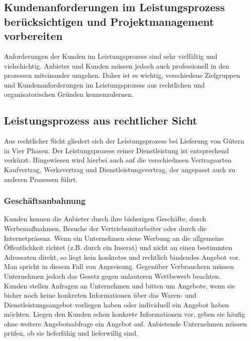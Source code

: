 \documentclass[a4paper, 12pt]{report}
\begin{document}
\begin{multicols}{2}
\section{Kundenanforderungen im Leistungsprozess berücksichtigen und
Projektmanagement vorbereiten}

Anforderungen der Kunden im Leistungsprozess sind sehr vielfältig und
vielschichtig. Anbieter und Kunden müssen jedoch auch professionell in den
prozessen miteinander umgehen. Daher ist es wichtig, verschiedene Zielgruppen
und Kundenanforderungen im Leistungsprozess aus rechtlichen und
organisatorischen Gründen kennenzulernen.

\subsection{Leistungsprozess aus rechtlicher Sicht}

Aus rechtlicher Sicht gliedert sich der Leistungsprozess bei Lieferung von
Gütern in Vier Phasen. Der Leistungsprozess reiner Dienstleistung ist
entsprechend verkürzt. Hingewiesen wird hierbei auch auf die verschiedneen
Vertragsarten Kaufvertrag, Werksvertrag und Dienstleistungsvertrag, der
angepasst auch zu anderen Prozessen führt. \\

\subsubsection{Geschäftsanbahnung}

Kunden kennen die Anbieter durch ihre bisherigen Geschäfte, durch
Werbemaßnahmen, Besuche der Vertriebsmitarbeiter oder durch die Internetpräsenz.
Wenn ein Unternehmen siene Werbung an die allgemeine Öffentlichkeit richtet
(z.B. durch ein Inserat) und nicht an einen bestimmten Adressaten direkt, so
liegt kein konkretes und rechtlich bindendes Angebot vor. Man spricht in diesem
Fall von Anpreisung. Gegenüber Verbrauchern müssen Unternehmen jedoch das Gesetz
gegen unlauteren Wettbewerb beachten. \\

Kunden stellen Anfragen an Unternehmen und bitten um Angebote, wenn sie bisher
noch keine konkreten Informationen über das Waren- und Dienstleistungsangebot
vorliegen haben oder individuell ein Angebot haben möchten. Liegen den Kunden
schon konkrete Informationen vor, geben sie häufig ohne weitere Angebotsabfrage
ein Angebot auf. Anbietende Unternehmen müssen prüfen, ob sie lieferfähig und
lieferwillig sind.


\end{multicols}
\end{document}
